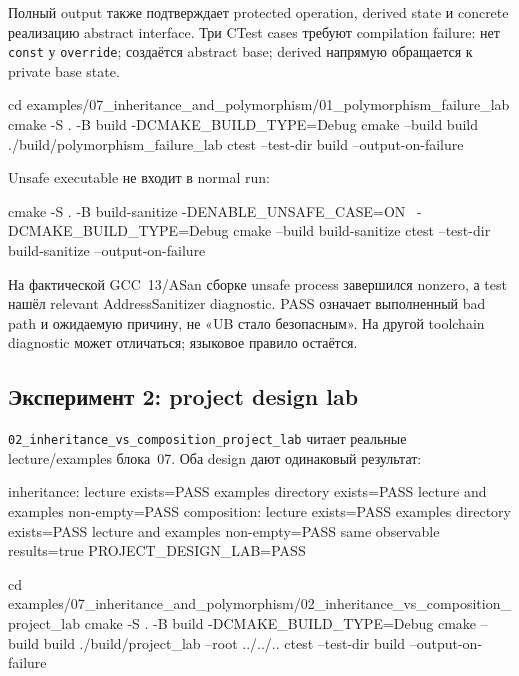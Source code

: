 Полный output также подтверждает protected operation, derived state и concrete
реализацию abstract interface. Три CTest cases требуют compilation failure:
нет \texttt{const} у \texttt{override}; создаётся abstract base; derived
напрямую обращается к private base state.

\begin{shellcode}
cd examples/07_inheritance_and_polymorphism/01_polymorphism_failure_lab
cmake -S . -B build -DCMAKE_BUILD_TYPE=Debug
cmake --build build
./build/polymorphism_failure_lab
ctest --test-dir build --output-on-failure
\end{shellcode}

Unsafe executable не входит в normal run:

\begin{shellcode}
cmake -S . -B build-sanitize -DENABLE_UNSAFE_CASE=ON \
  -DCMAKE_BUILD_TYPE=Debug
cmake --build build-sanitize
ctest --test-dir build-sanitize --output-on-failure
\end{shellcode}

На фактической GCC~13/ASan сборке unsafe process завершился nonzero, а test
нашёл relevant AddressSanitizer diagnostic. PASS означает выполненный bad path
и ожидаемую причину, не «UB стало безопасным». На другой toolchain diagnostic
может отличаться; языковое правило остаётся.

\subsection{Эксперимент 2: project design lab}

\texttt{02\_inheritance\_vs\_composition\_project\_lab} читает реальные
lecture/examples блока~07. Оба design дают одинаковый результат:

\begin{outputcode}
inheritance:
  lecture exists=PASS
  examples directory exists=PASS
  lecture and examples non-empty=PASS
composition:
  lecture exists=PASS
  examples directory exists=PASS
  lecture and examples non-empty=PASS
same observable results=true
PROJECT_DESIGN_LAB=PASS
\end{outputcode}

\begin{shellcode}
cd examples/07_inheritance_and_polymorphism/02_inheritance_vs_composition_project_lab
cmake -S . -B build -DCMAKE_BUILD_TYPE=Debug
cmake --build build
./build/project_lab --root ../../..
ctest --test-dir build --output-on-failure
\end{shellcode}

